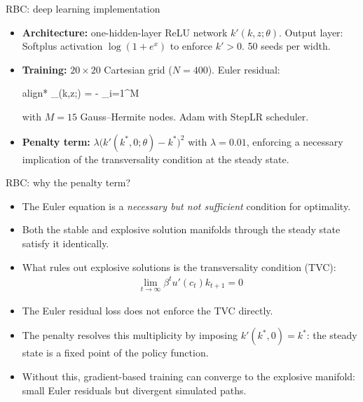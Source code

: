 \documentclass[aspectratio=169,10pt]{beamer}
\newcommand{\emphcolor}[1]{\textbf{\textcolor{emphcolorval}{#1}}}
\begin{document}
\begin{frame}{RBC: deep learning implementation}
	\begin{itemize}
		\item \emphcolor{Architecture:} one-hidden-layer ReLU network $k'(k,z;\theta)$. Output layer: Softplus activation $\log(1+e^x)$ to enforce $k' > 0$. 50 seeds per width.
		\item \emphcolor{Training:} $20 \times 20$ Cartesian grid ($N = 400$). Euler residual:
		\begin{empheq}[box=\tcbhighmath]{align*}
			\ell_{}(k,z;\theta) =  - \beta \sum_{i=1}^M  
		\end{empheq}
		with $M = 15$ Gauss--Hermite nodes. Adam with StepLR scheduler.
		\item \emphcolor{Penalty term:} $\lambda\big(k'(k^*,0;\theta) - k^*\big)^2$ with $\lambda = 0.01$, enforcing a necessary implication of the transversality condition at the steady state.
	\end{itemize}
\end{frame}

\begin{frame}{RBC: why the penalty term?}
	\begin{itemize}
		\item The Euler equation is a \emph{necessary but not sufficient} condition for optimality.
		\item Both the stable and explosive solution manifolds through the steady state satisfy it identically.
		\item What rules out explosive solutions is the transversality condition (TVC):
		\begin{align*}
			\lim_{t\to\infty} \beta^t u'(c_t) k_{t+1} = 0
		\end{align*}
		\item The Euler residual loss does not enforce the TVC directly.
		\item The penalty resolves this multiplicity by imposing $k'(k^*,0) = k^*$: the steady state is a fixed point of the policy function.
		\item Without this, gradient-based training can converge to the explosive manifold: small Euler residuals but divergent simulated paths.
	\end{itemize}
\end{frame}
\end{document}
